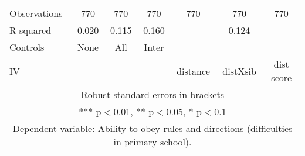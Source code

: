 \begin{tabular}{lcccccc}
Observations & 770 & 770 & 770 & 770 & 770 & 770 \\
R-squared & 0.020 & 0.115 & 0.160 &  & 0.124 &  \\
Controls & None & All & Inter &  &  &  \\
 IV &  &  &  & distance & distXsib & dist score \\ \hline
\multicolumn{7}{c}{ Robust standard errors in brackets} \\
\multicolumn{7}{c}{ *** p$<$0.01, ** p$<$0.05, * p$<$0.1} \\
\multicolumn{7}{c}{ Dependent variable: Ability to obey rules and directions (difficulties in primary school).} \\
\end{tabular}
